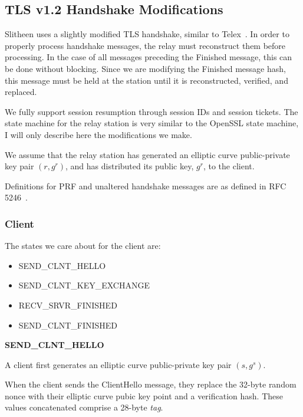 \documentclass[11pt]{article}
\theoremstyle{definittion}
\begin{document}
\subsection{TLS v1.2 Handshake Modifications}

Slitheen uses a slightly modified TLS handshake, similar to Telex~\cite{wustrow2011}. In order to properly process handshake messages, the relay must reconstruct them before processing. In the case of all messages preceding the Finished message, this can be done without blocking. Since we are modifying the Finished message hash, this message must be held at the station until it is reconstructed, verified, and replaced.

We fully support session resumption through session IDs and session tickets. The state machine for the relay station is very similar to the OpenSSL state machine, I will only describe here the modifications we make.

We assume that the relay station has generated an elliptic curve public-private key pair $(r, g^r)$, and has distributed its public key, $g^r$, to the client. %

Definitions for PRF and unaltered handshake messages are as defined in RFC 5246~\cite{rfc5246}.

\subsubsection{Client}

The states we care about for the client are:
\begin{itemize}
\item SEND\_CLNT\_HELLO
\item SEND\_CLNT\_KEY\_EXCHANGE
\item RECV\_SRVR\_FINISHED
\item SEND\_CLNT\_FINISHED
\end{itemize}

\textbf{SEND\_CLNT\_HELLO}

A client first generates an elliptic curve public-private key pair $(s, g^s)$.

When the client sends the ClientHello message, they replace the 32-byte random nonce with their elliptic curve pubic key point and a verification hash. These values concatenated comprise a 28-byte \emph{tag}.
\end{document}
